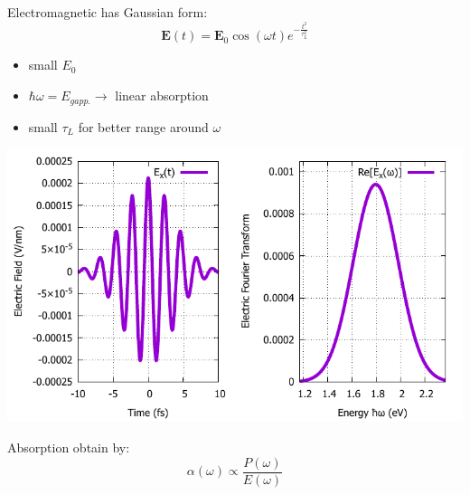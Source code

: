 \documentclass{beamer}
\begin{document}
	\begin{frame}
	\begin{multicols}{2}
Electromagnetic has Gaussian form:
\begin{equation}
	\textbf{E}(t) = \textbf{E}_0 \cos(\omega t)e^{-\frac{t^2}{\tau_L^2}}
\end{equation}
\begin{itemize}
	\item small $E_0$
	\item $\hbar \omega = E_{gapp.} \to $ linear absorption
	\item small $\tau_L$ for better range around $\omega$
\end{itemize}
\columnbreak
\includegraphics[width=1\linewidth]{images/Eat.pdf}

Absorption obtain by:
\begin{equation}
	\alpha(\omega) \propto \frac{P(\omega)}{E(\omega)}
\end{equation}
	\end{multicols}
	\end{frame}
\end{document}
